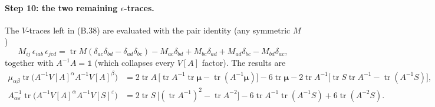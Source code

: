 \paragraph{Step 10: the two remaining $\epsilon$-traces.}
The $V$-traces left in (B.38) are evaluated with the pair identity (any symmetric $M$)
\begin{equation}
M_{ij}\,\epsilon_{iab}\,\epsilon_{jcd}
=\operatorname{tr}M(\delta_{ac}\delta_{bd}-\delta_{ad}\delta_{bc})
-M_{ac}\delta_{bd}+M_{bc}\delta_{ad}+M_{ad}\delta_{bc}-M_{bd}\delta_{ac} , \tag{B.42}
\end{equation}
together with $A^{-1}A=\mathbb 1$ (which collapses every $V[A]$ factor). The results are
\begin{align}
\mu_{\alpha\beta}\operatorname{tr}\bigl(A^{-1}V[A]^{\alpha}A^{-1}V[A]^{\beta}\bigr)
&=2\operatorname{tr}A\,\bigl[\operatorname{tr}A^{-1}\operatorname{tr}\boldsymbol\mu-\operatorname{tr}(A^{-1}\boldsymbol\mu)\bigr]
-6\operatorname{tr}\boldsymbol\mu-2\operatorname{tr}A^{-1}\bigl[\operatorname{tr}S\operatorname{tr}A^{-1}-\operatorname{tr}(A^{-1}S)\bigr], \tag{B.43}\\
A^{-1}_{\alpha\varepsilon}\operatorname{tr}\bigl(A^{-1}V[A]^{\alpha}A^{-1}V[S]^{\varepsilon}\bigr)
&=2\operatorname{tr}S\,\bigl[(\operatorname{tr}A^{-1})^{2}-\operatorname{tr}A^{-2}\bigr]
-6\operatorname{tr}A^{-1}\operatorname{tr}(A^{-1}S)+6\operatorname{tr}(A^{-2}S) . \tag{B.44}
\end{align}

